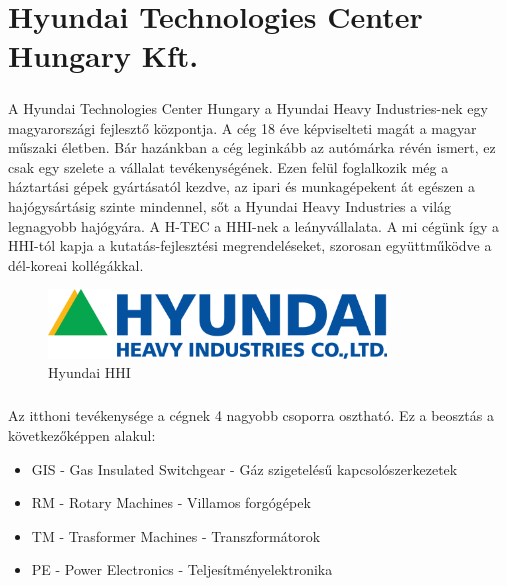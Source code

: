 \chapter{Hyundai Technologies Center Hungary Kft.}

\paragraph{}
A Hyundai Technologies Center Hungary a Hyundai Heavy Industries-nek egy magyarországi fejlesztő központja. A cég 18 éve képviselteti magát a magyar műszaki életben. Bár hazánkban a cég leginkább az autómárka révén ismert, ez csak egy szelete a vállalat tevékenységének. Ezen felül foglalkozik még a háztartási gépek gyártásatól kezdve, az ipari és munkagépekent át egészen a hajógysártásig szinte mindennel, sőt a Hyundai Heavy Industries a világ legnagyobb hajógyára.  A H-TEC a HHI-nek a leányvállalata. A mi cégünk így a HHI-tól kapja a kutatás-fejlesztési megrendeléseket, szorosan együttműködve a dél-koreai kollégákkal.

\begin{figure}[h]
	\centering
	\includegraphics[width = 0.8\textwidth]{figures/hyundai_logo.png}
	\caption{Hyundai HHI} 
	\label{fig:hhi}
\end{figure}

\paragraph{}
Az itthoni tevékenysége a cégnek 4 nagyobb csoporra osztható. Ez a beosztás a következőképpen alakul:


\begin{itemize}
	\item{GIS - Gas Insulated Switchgear - Gáz szigetelésű kapcsolószerkezetek}
	\item{RM - Rotary Machines - Villamos forgógépek}
	\item{TM - Trasformer Machines - Transzformátorok}
	\item{PE - Power Electronics - Teljesítményelektronika}
\end{itemize}




